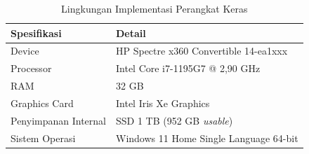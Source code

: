 \begin{table}[h]
\centering
\caption{Lingkungan Implementasi Perangkat Keras}
\label{tab:hw}
\begin{tabular}{|p{5cm}|p{8cm}|}
\hline
\textbf{Spesifikasi} & \textbf{Detail} \\ \hline
Device               & HP Spectre x360 Convertible 14-ea1xxx \\ \hline
Processor            & Intel Core i7-1195G7 @ 2,90 GHz \\ \hline
RAM                  & 32 GB \\ \hline
Graphics Card        & Intel Iris Xe Graphics \\ \hline
Penyimpanan Internal & SSD 1 TB (952 GB \textit{usable}) \\ \hline
Sistem Operasi       & Windows 11 Home Single Language 64-bit \\ \hline
\end{tabular}
\end{table}